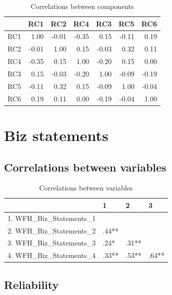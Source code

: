 \documentclass[]{article}
\begin{document}
\begin{table}[H]

\caption{\label{tab:unnamed-chunk-6}Correlations between components}
\centering
\fontsize{6}{8}\selectfont
\begin{tabular}[t]{lrrrrrr}
\toprule
  & RC1 & RC2 & RC4 & RC3 & RC5 & RC6\\
\midrule
RC1 & 1.00 & -0.01 & -0.35 & 0.15 & -0.11 & 0.19\\
RC2 & -0.01 & 1.00 & 0.15 & -0.03 & 0.32 & 0.11\\
RC4 & -0.35 & 0.15 & 1.00 & -0.20 & 0.15 & 0.00\\
RC3 & 0.15 & -0.03 & -0.20 & 1.00 & -0.09 & -0.19\\
RC5 & -0.11 & 0.32 & 0.15 & -0.09 & 1.00 & -0.04\\
\addlinespace
RC6 & 0.19 & 0.11 & 0.00 & -0.19 & -0.04 & 1.00\\
\bottomrule
\end{tabular}
\end{table}

\newpage

\hypertarget{biz-statements}{%
\section{Biz statements}\label{biz-statements}}

\hypertarget{correlations-between-variables-1}{%
\subsection{Correlations between
variables}\label{correlations-between-variables-1}}

\begin{table}[H]

\caption{\label{tab:unnamed-chunk-7}Correlations between variables}
\centering
\fontsize{6}{8}\selectfont
\begin{tabular}[t]{llll}
\toprule
  & 1 & 2 & 3\\
\midrule
1. WFH\_Biz\_Statements\_1 &  &  & \\
2. WFH\_Biz\_Statements\_2 & .44** &  & \\
3. WFH\_Biz\_Statements\_3 & .24* & .31** & \\
4. WFH\_Biz\_Statements\_4 & .33** & .53** & .64**\\
\bottomrule
\end{tabular}
\end{table}

\hypertarget{reliability}{%
\subsection{Reliability}\label{reliability}}
\end{document}
